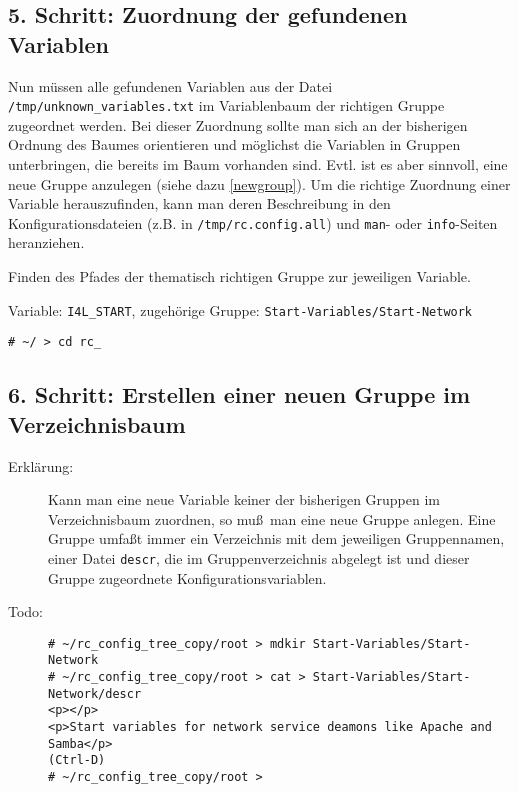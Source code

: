 \documentclass[pdftex,titlepage,10pt]{article}
\begin{document}
\subsection*{5. Schritt: Zuordnung der gefundenen Variablen}
\begin{description}\label{SchrittAnfang}
\item[Erkl\"arung:] Nun m\"ussen alle gefundenen Variablen aus der Datei
  {\tt /tmp/unknown\_variables.txt} im Variablenbaum der richtigen
  Gruppe zugeordnet werden. Bei dieser Zuordnung sollte man sich an der
  bisherigen Ordnung des Baumes orientieren und m\"oglichst die
  Variablen in Gruppen unterbringen, die bereits im Baum vorhanden sind.
  Evtl. ist es aber sinnvoll, eine neue Gruppe anzulegen (siehe dazu
  \ref{newgroup}). Um die richtige Zuordnung einer Variable herauszufinden,
  kann man deren Beschreibung in den Konfigurationsdateien (z.B. in
  {\tt /tmp/rc.config.all}) und {\tt man}- oder {\tt info}-Seiten heranziehen.
\item[Todo:] Finden des Pfades der thematisch richtigen Gruppe zur 
  jeweiligen Variable.
\item[Beispiel:] Variable: {\tt I4L\_START}, zugeh\"orige Gruppe:
  {\tt Start-Variables/Start-Network}
{\footnotesize\begin{verbatim}
# ~/ > cd rc_
\end{verbatim}}
\end{description}
\subsection*{6. Schritt: Erstellen einer neuen Gruppe im Verzeichnisbaum}\label{newgroup}
\begin{description}
\item[Erkl\"arung:] Kann man eine neue Variable keiner der bisherigen Gruppen
  im Verzeichnisbaum zuordnen, so mu\ss \ man eine neue Gruppe anlegen. Eine
  Gruppe umfa\ss t immer ein Verzeichnis mit dem jeweiligen Gruppennamen, einer
  Datei {\tt descr}, die im Gruppenverzeichnis abgelegt ist und dieser Gruppe
  zugeordnete Konfigurationsvariablen.
\item[Todo:]
{\footnotesize\begin{verbatim}
# ~/rc_config_tree_copy/root > mdkir Start-Variables/Start-Network
# ~/rc_config_tree_copy/root > cat > Start-Variables/Start-Network/descr
<p></p>
<p>Start variables for network service deamons like Apache and Samba</p>
(Ctrl-D)
# ~/rc_config_tree_copy/root >
\end{verbatim}}
\end{description}
\end{document}
